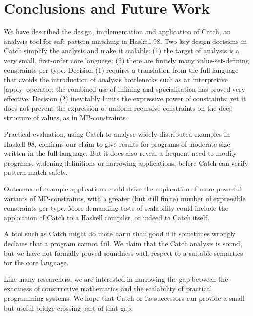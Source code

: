 \documentclass[preprint]{sigplanconf}
\begin{document}
\section{Conclusions and Future Work}
\label{sec:conclusion}

We have described the design, implementation and application of Catch,
an analysis tool for safe pattern-matching in Haskell 98.  Two key
design decisions in Catch simplify the analysis and make it scalable:
(1) the target of analysis is a very small, first-order core language;
(2) there are finitely many value-set-defining constraints per type.
Decision (1) requires a translation from the full language that avoids
the introduction of analysis bottlenecks such as an interpretive |apply|
operator; the combined use of inlining and specialisation has proved
very effective.  Decision (2) inevitably limits the expressive power of
constraints; yet it does not prevent the expression of uniform recursive
constraints on the deep structure of values, as in MP-constraints.

Practical evaluation, using Catch to analyse widely distributed examples
in Haskell 98, confirms our claim to give results for programs of moderate
size written in the full language. But it does also reveal a frequent need
to modify programs, widening definitions or narrowing applications,
before Catch can verify pattern-match safety.

Outcomes of example applications could drive the exploration of more
powerful variants of MP-constraints, with a greater (but still finite)
number of expressible constraints per type.  More demanding tests of
scalability could include the application of Catch to a Haskell compiler,
or indeed to Catch itself.

A tool such as Catch might do more harm than good if it sometimes wrongly
declares that a program cannot fail.  We claim that the Catch analysis
is sound, but we have not formally proved soundness with respect to a
suitable semantics for the core language.

Like many researchers, we are interested in narrowing the gap between the
exactness of constructive mathematics and the scalability of practical
programming systems.  We hope that Catch or its successors can provide
a small but useful bridge crossing part of that gap.



\end{document}
